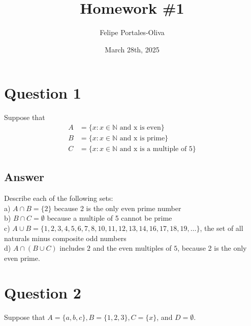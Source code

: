 \documentclass[
	12pt, %
]{fphw}
\title{Homework \#1} %
\author{Felipe Portales-Oliva} %
\date{March 28th, 2025} %
\institute{University of Mars \\ Institute of Intergalactic Travel} %
\newcommand\set[1]{\{#1\}}
\begin{document}
\maketitle %


\section*{Question 1}

\begin{problem}
Suppose that
\begin{align*}
	A &= \set{x : x \in \mathbb{N} \text{ and x is even}}\\
	B &= \set{x : x \in \mathbb{N} \text{ and x is prime}}\\
	C &= \set{x : x \in \mathbb{N} \text{ and x is a multiple of 5}}
\end{align*}	
\end{problem}


\subsection*{Answer} Describe each of the following sets:\\
a) $A \cap B = \set{2}$   because 2 is the only even prime number\\
b) $B \cap C = \emptyset$ because a multiple of 5 cannot be prime\\
c) $A \cup B = \set{1, 2, 3, 4, 5, 6, 7, 8, 10, 11, 12, 13, 14, 16, 17, 18, 19, \ldots}$, the set of all naturals minus composite odd numbers\\
d) $A \cap (B \cup C)$ includes $2$ and the even multiples of $5$, because 2 is the only even prime.


\section*{Question 2}

\begin{problem}
Suppose that $A = \set{a,b,c}, B = \set{1,2,3}, C = \set{x}$, and $D = \emptyset$.
\end{problem}
\end{document}
